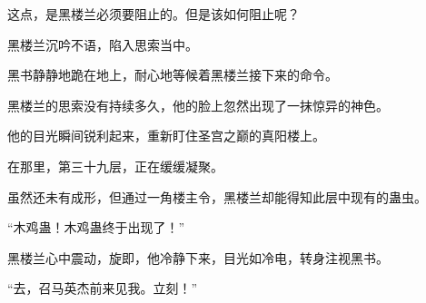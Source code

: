 \begin{this_body}
这点，是黑楼兰必须要阻止的。但是该如何阻止呢？

黑楼兰沉吟不语，陷入思索当中。

黑书静静地跪在地上，耐心地等候着黑楼兰接下来的命令。

黑楼兰的思索没有持续多久，他的脸上忽然出现了一抹惊异的神色。

他的目光瞬间锐利起来，重新盯住圣宫之巅的真阳楼上。

在那里，第三十九层，正在缓缓凝聚。

虽然还未有成形，但通过一角楼主令，黑楼兰却能得知此层中现有的蛊虫。

“木鸡蛊！木鸡蛊终于出现了！”

黑楼兰心中震动，旋即，他冷静下来，目光如冷电，转身注视黑书。

“去，召马英杰前来见我。立刻！”

\end{this_body}

